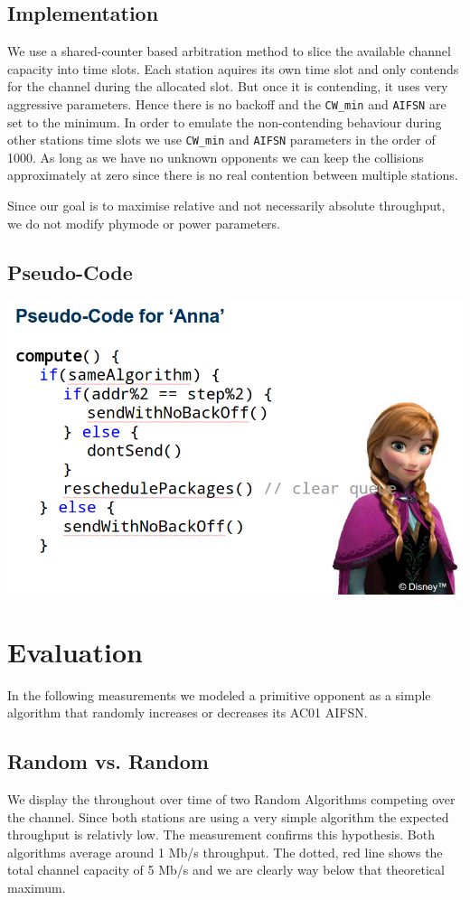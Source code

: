 \documentclass[12pt]{article}
\begin{document}
\subsection{Implementation}
We use a shared-counter based arbitration method to slice the available channel capacity into time slots. Each station aquires its own time slot and only contends for the channel during the allocated slot. But once it is contending, it uses very aggressive parameters. Hence there is no backoff and the \texttt{CW\_min} and \texttt{AIFSN} are set to the minimum.
In order to emulate the non-contending behaviour during other stations time slots we use  \texttt{CW\_min} and \texttt{AIFSN} parameters in the order of 1000. As long as we have no unknown opponents we can keep the collisions approximately at zero since there is no real contention between multiple stations.

Since our goal is to maximise relative and not necessarily absolute throughput, we do not  modify phymode or power parameters.

\subsection{Pseudo-Code}

\includegraphics[width=160mm]{img/pseudocode.png}



\section{Evaluation}
In the following measurements we modeled a primitive opponent as a simple algorithm that randomly increases or decreases its AC01 AIFSN. 
\subsection{Random vs. Random}
We display the throughout over time of two Random Algorithms competing over the channel.
Since both stations are using a very simple algorithm the expected throughput is relativly low. The measurement confirms this hypothesis. Both algorithms average around 1 Mb/s throughput. The dotted, red line shows the total channel capacity of 5 Mb/s and we are clearly way below that theoretical maximum.
\end{document}
